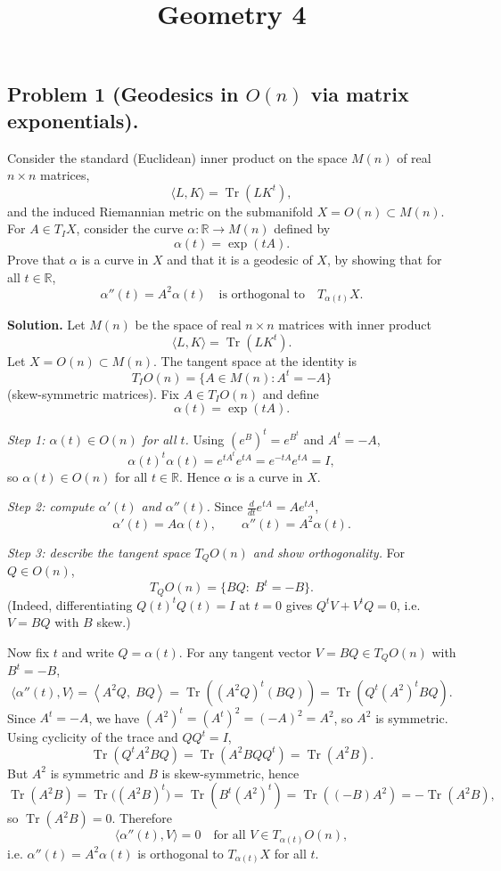 \documentclass[12pt,a4paper]{article}
\title{Geometry 4}
\author{}
\date{}
\theoremstyle{plain}
\theoremstyle{definition}      %
\begin{document}
	\maketitle

\subsection*{Problem 1 (Geodesics in \(O(n)\) via matrix exponentials).}
Consider the standard (Euclidean) inner product on the space \(M(n)\) of real \(n\times n\) matrices,
\[
\langle L,K\rangle=\operatorname{Tr}(L K^{t}),
\]
and the induced Riemannian metric on the submanifold \(X=O(n)\subset M(n)\).
For \(A\in T_{I}X\), consider the curve \(\alpha:\mathbb{R}\to M(n)\) defined by
\[
\alpha(t)=\exp(tA).
\]
Prove that \(\alpha\) is a curve in \(X\) and that it is a geodesic of \(X\), by showing that for all \(t\in\mathbb{R}\),
\[
\alpha''(t)=A^{2}\alpha(t)\quad\text{is orthogonal to}\quad T_{\alpha(t)}X.
\]

\textbf{Solution.}
Let \(M(n)\) be the space of real \(n\times n\) matrices with inner product
\[
\langle L,K\rangle=\operatorname{Tr}(L K^{t}).
\]
Let \(X=O(n)\subset M(n)\). The tangent space at the identity is
\[
T_I O(n)=\{A\in M(n): A^{t}=-A\}
\]
(skew-symmetric matrices). Fix \(A\in T_I O(n)\) and define
\[
\alpha(t)=\exp(tA).
\]

\medskip
\emph{Step 1: \(\alpha(t)\in O(n)\) for all \(t\).}
Using \((e^{B})^{t}=e^{B^{t}}\) and \(A^{t}=-A\),
\[
\alpha(t)^{t}\alpha(t)=e^{tA^{t}}e^{tA}=e^{-tA}e^{tA}=I,
\]
so \(\alpha(t)\in O(n)\) for all \(t\in\mathbb{R}\). Hence \(\alpha\) is a curve in \(X\).

\medskip
\emph{Step 2: compute \(\alpha'(t)\) and \(\alpha''(t)\).}
Since \(\frac{d}{dt}e^{tA}=Ae^{tA}\),
\[
\alpha'(t)=A\alpha(t),\qquad \alpha''(t)=A^2\alpha(t).
\]

\medskip
\emph{Step 3: describe the tangent space \(T_QO(n)\) and show orthogonality.}
For \(Q\in O(n)\),
\[
T_Q O(n)=\{BQ:\; B^{t}=-B\}.
\]
(Indeed, differentiating \(Q(t)^{t}Q(t)=I\) at \(t=0\) gives \(Q^{t}V+V^{t}Q=0\), i.e. \(V=BQ\) with \(B\) skew.)

Now fix \(t\) and write \(Q=\alpha(t)\). For any tangent vector \(V=BQ\in T_QO(n)\) with \(B^{t}=-B\),
\[
\langle \alpha''(t), V\rangle
=\left\langle A^{2}Q,\; BQ\right\rangle
=\operatorname{Tr}\!\left((A^{2}Q)^{t}(BQ)\right)
=\operatorname{Tr}\!\left(Q^{t}(A^{2})^{t}BQ\right).
\]
Since \(A^{t}=-A\), we have \((A^{2})^{t}=(A^{t})^{2}=(-A)^{2}=A^{2}\), so \(A^{2}\) is symmetric. Using cyclicity of the trace and \(QQ^{t}=I\),
\[
\operatorname{Tr}\!\left(Q^{t}A^{2}BQ\right)=\operatorname{Tr}(A^{2}BQQ^{t})=\operatorname{Tr}(A^{2}B).
\]
But \(A^{2}\) is symmetric and \(B\) is skew-symmetric, hence
\[
\operatorname{Tr}(A^{2}B)=\operatorname{Tr}\big((A^{2}B)^{t}\big)
=\operatorname{Tr}(B^{t}(A^{2})^{t})
=\operatorname{Tr}((-B)A^{2})
=-\operatorname{Tr}(A^{2}B),
\]
so \(\operatorname{Tr}(A^{2}B)=0\). Therefore
\[
\langle \alpha''(t), V\rangle=0 \quad\text{for all }V\in T_{\alpha(t)}O(n),
\]
i.e. \(\alpha''(t)=A^{2}\alpha(t)\) is orthogonal to \(T_{\alpha(t)}X\) for all \(t\).
\end{document}
